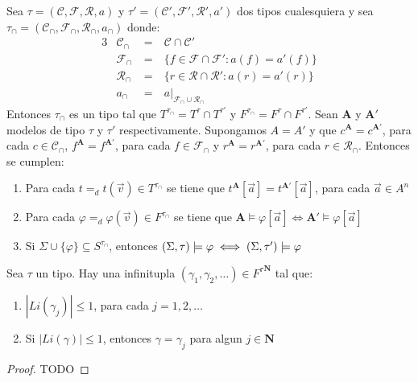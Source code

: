 \begin{lemma}
  Sea $\tau=(\mathcal{C},\mathcal{F},\mathcal{R},a)$ y $\tau'=(\mathcal{C}',\mathcal{F}',\mathcal{R}',a')$ dos tipos cualesquiera y sea $\tau_\cap=(\mathcal{C}_\cap,\mathcal{F}_\cap,\mathcal{R}_\cap,a_\cap)$ donde:
  \begin{alignat*}{3}
    &\mathcal{C}_\cap&\ =&\ \mathcal{C}\cap\mathcal{C}'\\
    &\mathcal{F}_\cap&\ =&\ \{f\in\mathcal{F}\cap\mathcal{F}':a(f)=a'(f)\}\\
    &\mathcal{R}_\cap&\ =&\ \{r\in\mathcal{R}\cap\mathcal{R}':a(r)=a'(r)\}\\
    &a_\cap&\ =&\ a|_{\mathcal{F}_\cap\cup\mathcal{R}_\cap}
  \end{alignat*}
  Entonces $\tau_\cap$ es un tipo tal que $T^{\tau_\cap}=T^\tau\cap T^{\tau'}$ y $F^{\tau_\cap}=F^\tau\cap F^{\tau'}$. Sean $\mathbf{A}$
  y $\mathbf{A'}$ modelos de tipo $\tau$ y $\tau'$ respectivamente. Supongamos $A=A'$ y que $c^\mathbf{A}=c^\mathbf{A'}$, para cada $c\in\mathcal{C}_\cap$,
  $f^\mathbf{A}=f^\mathbf{A'}$, para cada $f\in\mathcal{F}_\cap$ y $r^\mathbf{A}=r^\mathbf{A'}$, para cada $r\in\mathcal{R}_\cap$. Entonces se cumplen: \begin{enumerate}
    \item Para cada $t=_d t(\vec{v})\in T^{\tau_\cap}$ se tiene que $t^\mathbf{A}[\vec{a}]=t^\mathbf{A'}[\vec{a}]$, para cada $\vec{a}\in A^n$
    \item Para cada $\varphi =_d \varphi(\vec{v})\in F^{\tau_\cap}$ se tiene que $\mathbf{A}\models\varphi[\vec{a}]\iff\mathbf{A'}\models\varphi[\vec{a}]$
    \item Si $\Sigma\cup\{\varphi\}\subseteq S^{\tau_\cap}$, entonces $(\Sigma,\tau)\models\varphi\iff(\Sigma,\tau')\models\varphi$
  \end{enumerate}
\end{lemma}

\noproof

\begin{lemma}
  Sea $\tau$ un tipo. Hay una infinitupla $(\gamma_1,\gamma_2,\dots)\in {F^\tau}^\mathbf{N}$ tal que:\begin{enumerate}
    \item $|Li(\gamma_j)|\leq 1$, para cada $j=1,2,\dots$
    \item Si $|Li(\gamma)|\leq 1$, entonces $\gamma=\gamma_j$ para algun $j\in\mathbf{N}$
  \end{enumerate}
\end{lemma}
\begin{proof}
  TODO
\end{proof}

